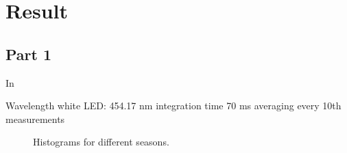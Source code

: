 \section{Result}
\subsection{Part 1}
In 

Wavelength white LED: 454.17 nm 
integration time 70 ms 
averaging every 10th measurements

\begin{figure}[H]
    \centering
    \hfill
    
    \vspace{0.5cm}
    

    
    \caption{Histograms for different seasons.}
    \label{fig:part1}
\end{figure}


